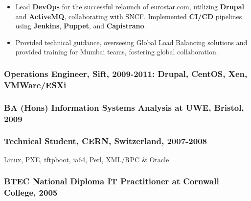 \documentclass[
]{article}
\begin{document}
\begin{itemize}
\item
  Lead \textbf{DevOps} for the successful relaunch of eurostar.com,
  utilizing \textbf{Drupal} and \textbf{ActiveMQ}, collaborating with
  SNCF. Implemented \textbf{CI/CD} pipelines using \textbf{Jenkins},
  \textbf{Puppet}, and \textbf{Capistrano}.
\item
  Provided technical guidance, overseeing Global Load Balancing
  solutions and provided training for Mumbai teams, fostering global
  collaboration.
\end{itemize}

\hypertarget{material-office-building-operations-engineer-sift-2009-2011-drupal-centos-xen-vmwareesxi}{%
\subsubsection{\texorpdfstring{\faBuilding Operations Engineer, Sift,
2009-2011: Drupal, CentOS, Xen,
VMWare/ESXi}{ Operations Engineer, Sift, 2009-2011: Drupal, CentOS, Xen, VMWare/ESXi}}\label{material-office-building-operations-engineer-sift-2009-2011-drupal-centos-xen-vmwareesxi}}

\hypertarget{material-school-ba-hons-information-systems-analysis-at-uwe-bristol-2009}{%
\subsubsection{\texorpdfstring{\faSchool BA (Hons) Information Systems
Analysis at UWE, Bristol,
2009}{ BA (Hons) Information Systems Analysis at UWE, Bristol, 2009}}\label{material-school-ba-hons-information-systems-analysis-at-uwe-bristol-2009}}

\hypertarget{material-atom-technical-student-cern-switzerland-2007-2008}{%
\subsubsection{\texorpdfstring{\faAtom Technical Student, CERN,
Switzerland,
2007-2008}{ Technical Student, CERN, Switzerland, 2007-2008}}\label{material-atom-technical-student-cern-switzerland-2007-2008}}

Linux, PXE, tftpboot, ia64, Perl, XML/RPC \& Oracle

\hypertarget{material-school-btec-national-diploma-it-practitioner-at-cornwall-college-2005}{%
\subsubsection{\texorpdfstring{\faSchool BTEC National Diploma IT
Practitioner at Cornwall College,
2005}{ BTEC National Diploma IT Practitioner at Cornwall College, 2005}}\label{material-school-btec-national-diploma-it-practitioner-at-cornwall-college-2005}}
\end{document}
